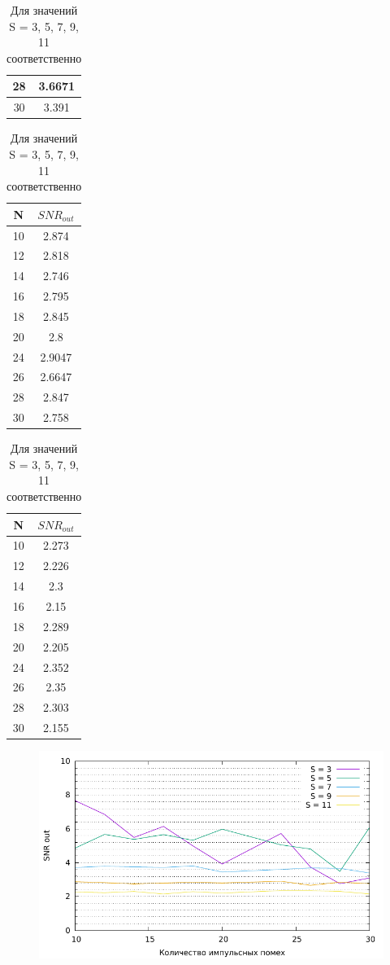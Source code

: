 \documentclass[12pt, a4paper] {ncc}
\begin{document}
\begin{table}[H]
\begin{tabular} { |c|c| }
			28 &  3.6671 \\ \hline
			30 &  3.391 \\ \hline
            \end{tabular}
            \begin{tabular} { |c|c| }
                \hline
				\textbf{N} & \textbf{$SNR_{out}$} \\ \hline
			10 &  2.874 \\ \hline
			12 &  2.818 \\ \hline
			14 &  2.746 \\ \hline
			16 &  2.795 \\ \hline
			18 &  2.845 \\ \hline
			20 &  2.8 \\ \hline
			24 &  2.9047 \\ \hline
			26 &  2.6647 \\ \hline
			28 &  2.847 \\ \hline
			30 &  2.758 \\ \hline
            \end{tabular}
            \begin{tabular} { |c|c| }
                \hline
				\textbf{N} & \textbf{$SNR_{out}$} \\ \hline

			10 &  2.273 \\ \hline
			12 &  2.226 \\ \hline
			14 &  2.3 \\ \hline
			16 &  2.15 \\ \hline
			18 &  2.289 \\ \hline
			20 &  2.205 \\ \hline
			24 &  2.352 \\ \hline
			26 &  2.35 \\ \hline
			28 &  2.303 \\ \hline
			30 &  2.155 \\ \hline
            \end{tabular}
			\caption{Для значений S = 3, 5, 7, 9, 11 соответственно}
        \end{table}

        \begin{figure}[H]
            \centering
            \includegraphics[scale=0.9,page=1]{med.pdf}
			\caption{}
        \end{figure}
\end{document}
